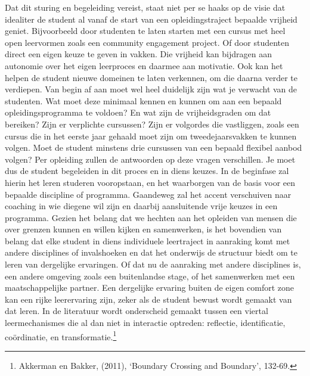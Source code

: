 \documentclass[smallauthor, chapterhaspagenum, nochapterinheader, pagenuminheader,  bigchapnum,medium2, tocpages,  garamond, titleinheader]{jote-book}
\begin{document}
	Dat dit sturing en begeleiding vereist, staat niet per se haaks op de visie dat idealiter de student al vanaf de start van een opleidingstraject bepaalde vrijheid geniet. Bijvoorbeeld door studenten te laten starten met een cursus met heel open leervormen zoals een community engagement project. Of door studenten direct een eigen keuze te geven in vakken. Die vrijheid kan bijdragen aan autonomie over het eigen leerproces en daarmee aan motivatie. Ook kan het helpen de student nieuwe domeinen te laten verkennen, om die daarna verder te verdiepen. Van begin af aan moet wel heel duidelijk zijn wat je verwacht van de studenten. Wat moet deze minimaal kennen en kunnen om aan een bepaald opleidingsprogramma te voldoen? En wat zijn de vrijheidsgraden om dat bereiken? Zijn er verplichte cursussen? Zijn er volgordes die vastliggen, zoals een cursus die in het eerste jaar gehaald moet zijn om tweedejaarsvakken te kunnen volgen. Moet de student minstens drie cursussen van een bepaald flexibel aanbod volgen? Per opleiding zullen de antwoorden op deze vragen verschillen. Je moet dus de student begeleiden in dit proces en in diens keuzes. In de beginfase zal hierin het leren studeren vooropstaan, en het waarborgen van de basis voor een bepaalde discipline of programma. Gaandeweg zal het accent verschuiven naar coaching in wie diegene wil zijn en daarbij aansluitende vrije keuzes in een programma. Gezien het belang dat we hechten aan het opleiden van mensen die over grenzen kunnen en willen kijken en samenwerken, is het bovendien van belang dat elke student in diens individuele leertraject in aanraking komt met andere disciplines of invalshoeken en dat het onderwijs de structuur biedt om te leren van dergelijke ervaringen. Of dat nu de aanraking met andere disciplines is, een andere omgeving zoals een buitenlandse stage, of het samenwerken met een maatschappelijke partner. Een dergelijke ervaring buiten de eigen comfort zone kan een rijke leerervaring zijn, zeker als de student bewust wordt gemaakt van dat leren. In de literatuur wordt onderscheid gemaakt tussen een viertal leermechanismes die al dan niet in interactie optreden: reflectie, identificatie, coördinatie, en transformatie.\footnote{Akkerman en Bakker, (2011), ‘Boundary Crossing and Boundary', 132-69.}
\end{document}
